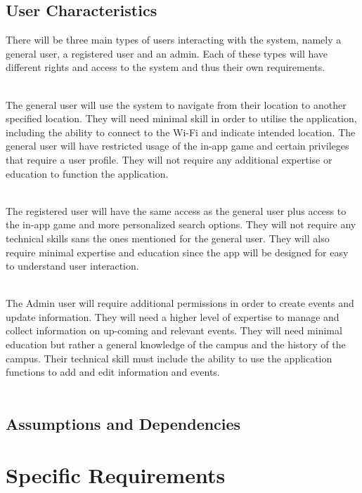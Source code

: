 \documentclass{article}
\begin{document}
    	\subsection{User Characteristics}  
{There will be three main types of users interacting with the system, namely a general user, a registered user and an admin. Each of these types will have different rights and access to the system and thus their own requirements.\\\\}

{The general user will use the system to navigate from their location to another specified location. They will need minimal skill in order to utilise the application, including the ability to connect to the Wi-Fi and indicate intended location. The general user will have restricted usage of the in-app game and certain privileges that require a user profile. They will not require any additional expertise or education to function the application.\\\\}

{The registered user will have the same access as the general user plus access to the in-app game and more personalized search options. They will not require any technical skills sans the ones mentioned for the general user. They will also require minimal expertise and education since the app will be designed for easy to understand user interaction.\\\\}

{The Admin user will require additional permissions in order to create events and update information. They will need a higher level of expertise to manage and collect information on up-coming and relevant events. They will need minimal education but rather a general knowledge of the campus and the history of the campus. Their technical skill must include the ability to use the application functions to add and edit information and events.\\\\} 
   
    	\subsection{Assumptions and Dependencies}
    	

	\section{Specific Requirements}
   
\end{document}
